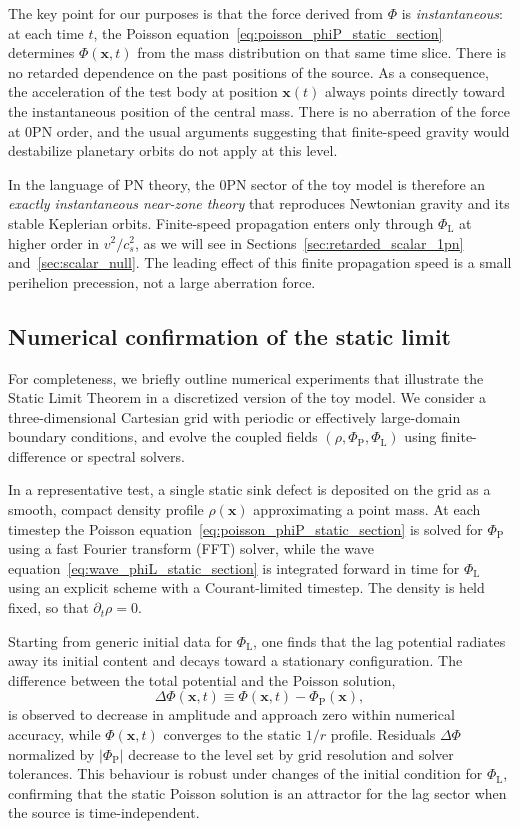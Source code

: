 \documentclass[11pt]{article}
\newcommand{\cS}{c_s}
\newcommand{\PhiP}{\Phi_{\mathrm{P}}}
\newcommand{\PhiL}{\Phi_{\mathrm{L}}}
\begin{document}
The key point for our purposes is that the force derived from $\Phi$ is \emph{instantaneous}: at each time $t$, the Poisson equation~\eqref{eq:poisson_phiP_static_section} determines $\Phi(\mathbf{x},t)$ from the mass distribution on that same time slice. There is no retarded dependence on the past positions of the source. As a consequence, the acceleration of the test body at position $\mathbf{x}(t)$ always points directly toward the instantaneous position of the central mass. There is no aberration of the force at 0PN order, and the usual arguments suggesting that finite-speed gravity would destabilize planetary orbits do not apply at this level.

In the language of PN theory, the 0PN sector of the toy model is therefore an \emph{exactly instantaneous near-zone theory} that reproduces Newtonian gravity and its stable Keplerian orbits. Finite-speed propagation enters only through $\PhiL$ at higher order in $v^2/\cS^2$, as we will see in Sections~\ref{sec:retarded_scalar_1pn} and~\ref{sec:scalar_null}. The leading effect of this finite propagation speed is a small perihelion precession, not a large aberration force.

\subsection{Numerical confirmation of the static limit}
\label{sec:static_numeric}

For completeness, we briefly outline numerical experiments that illustrate the Static Limit Theorem in a discretized version of the toy model. We consider a three-dimensional Cartesian grid with periodic or effectively large-domain boundary conditions, and evolve the coupled fields $(\rho,\PhiP,\PhiL)$ using finite-difference or spectral solvers.

In a representative test, a single static sink defect is deposited on the grid as a smooth, compact density profile $\rho(\mathbf{x})$ approximating a point mass. At each timestep the Poisson equation~\eqref{eq:poisson_phiP_static_section} is solved for $\PhiP$ using a fast Fourier transform (FFT) solver, while the wave equation~\eqref{eq:wave_phiL_static_section} is integrated forward in time for $\PhiL$ using an explicit scheme with a Courant-limited timestep. The density is held fixed, so that $\partial_t \rho = 0$.

Starting from generic initial data for $\PhiL$, one finds that the lag potential radiates away its initial content and decays toward a stationary configuration. The difference between the total potential and the Poisson solution,
\begin{equation}
  \Delta \Phi(\mathbf{x},t) \equiv \Phi(\mathbf{x},t) - \PhiP(\mathbf{x}),
\end{equation}
is observed to decrease in amplitude and approach zero within numerical accuracy, while $\Phi(\mathbf{x},t)$ converges to the static $1/r$ profile. Residuals $\Delta \Phi$ normalized by $|\PhiP|$ decrease to the level set by grid resolution and solver tolerances. This behaviour is robust under changes of the initial condition for $\PhiL$, confirming that the static Poisson solution is an attractor for the lag sector when the source is time-independent.
\end{document}
